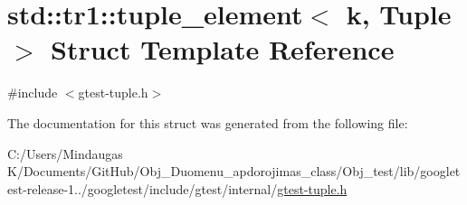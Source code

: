 \hypertarget{structstd_1_1tr1_1_1tuple__element}{}\section{std\+::tr1\+::tuple\+\_\+element$<$ k, Tuple $>$ Struct Template Reference}
\label{structstd_1_1tr1_1_1tuple__element}


{\ttfamily \#include $<$gtest-\/tuple.\+h$>$}



The documentation for this struct was generated from the following file\+:\begin{DoxyCompactItemize}
\item 
C\+:/\+Users/\+Mindaugas K/\+Documents/\+Git\+Hub/\+Obj\+\_\+\+Duomenu\+\_\+apdorojimas\+\_\+class/\+Obj\+\_\+test/lib/googletest-\/release-\/1../googletest/include/gtest/internal/\mbox{\hyperlink{gtest-tuple_8h}{gtest-\/tuple.\+h}}\end{DoxyCompactItemize}
